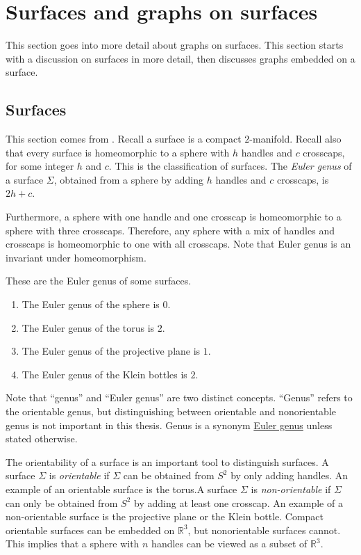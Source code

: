 \section{Surfaces and graphs on surfaces}

This section goes into more detail about graphs on surfaces. This section starts with a discussion on surfaces in more detail, then discusses graphs embedded on a surface.

\subsection{Surfaces}

This section comes from \textcite{moharGraphsSurfaces2001}. Recall a surface is a compact $2$-manifold. Recall also that every surface is homeomorphic to a sphere with $h$ handles and $c$ crosscaps, for some integer $h$ and $c$. This is the classification of surfaces. The \textit{Euler genus} of a surface \(\Sigma\), obtained from a sphere by adding \(h\) handles and \(c\) crosscaps, is \(2h + c\).

Furthermore, a sphere with one handle and one crosscap is homeomorphic to a sphere with three crosscaps. Therefore, any sphere with a mix of handles and crosscaps is homeomorphic to one with all crosscaps. Note that Euler genus is an invariant under homeomorphism. 

These are the Euler genus of some surfaces.
\begin{enumerate}
	\item The Euler genus of the sphere is \(0\).
	\item The Euler genus of the torus is \(2\).
	\item The Euler genus of the projective plane is \(1\). 
	\item The Euler genus of the Klein bottles is \(2\). 
\end{enumerate}

Note that ``genus'' and ``Euler genus'' are two distinct concepts. ``Genus'' refers to the orientable genus, but distinguishing between orientable and nonorientable genus is not important in this thesis. Genus is a synonym \underline{Euler genus} unless stated otherwise.

The orientability of a surface is an important tool to distinguish surfaces. A surface \(\Sigma\) is \textit{orientable} if \(\Sigma\) can be obtained from \(S^2\) by only adding handles. An example of an orientable surface is the torus.A surface \(\Sigma\) is \textit{non-orientable} if \(\Sigma\) can only be obtained from \(S^2\) by adding at least one crosscap. An example of a non-orientable surface is the projective plane or the Klein bottle. Compact orientable surfaces can be embedded on $\mathbb{R}^3$, but nonorientable surfaces cannot. This implies that a sphere with $n$ handles can be viewed as a subset of $\mathbb{R}^3$. 

